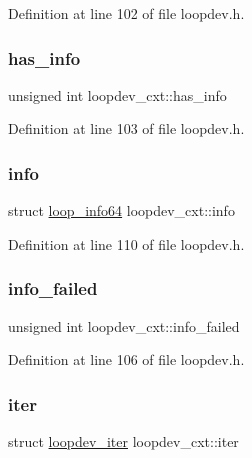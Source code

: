 Definition at line 102 of file loopdev.\+h.

\mbox{\label{structloopdev__cxt_ae332fed661241c0c194f86a351cb8e5d}} 
\subsubsection{\texorpdfstring{has\+\_\+info}{has\_info}}
{\footnotesize\ttfamily unsigned int loopdev\+\_\+cxt\+::has\+\_\+info}



Definition at line 103 of file loopdev.\+h.

\mbox{\label{structloopdev__cxt_ae710cb127da89f99ef75c35620038f0b}} 
\subsubsection{\texorpdfstring{info}{info}}
{\footnotesize\ttfamily struct \hyperlink{structloop__info64}{loop\+\_\+info64} loopdev\+\_\+cxt\+::info}



Definition at line 110 of file loopdev.\+h.

\mbox{\label{structloopdev__cxt_afa35dde0869a906d5557ba88bbe4df5d}} 
\subsubsection{\texorpdfstring{info\+\_\+failed}{info\_failed}}
{\footnotesize\ttfamily unsigned int loopdev\+\_\+cxt\+::info\+\_\+failed}



Definition at line 106 of file loopdev.\+h.

\mbox{\label{structloopdev__cxt_acdf33a98f396c924eec2be67e918434c}} 
\subsubsection{\texorpdfstring{iter}{iter}}
{\footnotesize\ttfamily struct \hyperlink{structloopdev__iter}{loopdev\+\_\+iter} loopdev\+\_\+cxt\+::iter}



